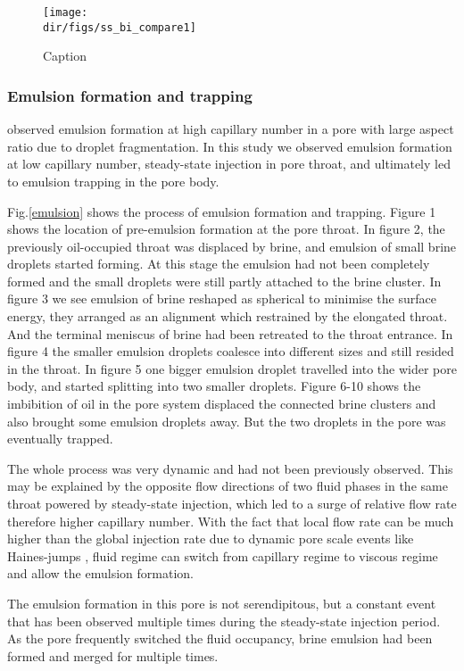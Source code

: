 \begin{figure}
    \centering
    \texttt{[image: \\dir/figs/ss\_bi\_compare1]}
    \caption{Caption}
    \label{centralchannel}
\end{figure}

\subsubsection{Emulsion formation and trapping}\label{emulsionformationandtrapping}
\citet{pak2015droplet} observed emulsion formation at high capillary number in a pore with large aspect ratio due to droplet fragmentation. In this study we observed emulsion formation at low capillary number, steady-state injection in pore throat, and ultimately led to emulsion trapping in the pore body.

Fig.\ref{emulsion} shows the process of emulsion formation and trapping. Figure 1 shows the location of pre-emulsion formation at the pore throat. In figure 2, the previously oil-occupied throat was displaced by brine, and emulsion of small brine droplets started forming. At this stage the emulsion had not been completely formed and the small droplets were still partly attached to the brine cluster. In figure 3 we see emulsion of brine reshaped as spherical to minimise the surface energy, they arranged as an alignment which restrained by the elongated throat. And the terminal meniscus of brine had been retreated to the throat entrance. In figure 4 the smaller emulsion droplets coalesce into different sizes and still resided in the throat. In figure 5 one bigger emulsion droplet travelled into the wider pore body, and started splitting into two smaller droplets. Figure 6-10 shows the imbibition of oil in the pore system displaced the connected brine clusters and also brought some emulsion droplets away. But the two droplets in the pore was eventually trapped.

The whole process was very dynamic and had not been previously observed. This may be explained by the opposite flow directions of two fluid phases in the same throat powered by steady-state injection, which led to a surge of relative flow rate therefore higher capillary number. With the fact that local flow rate can be much higher than the global injection rate due to dynamic pore scale events like Haines-jumps \citep{armstrong2013interfacial}, fluid regime can switch from capillary regime to viscous regime and allow the emulsion formation.

The emulsion formation in this pore is not serendipitous, but a constant event that has been observed multiple times during the steady-state injection period. As the pore frequently switched the fluid occupancy, brine emulsion had been formed and merged for multiple times.

